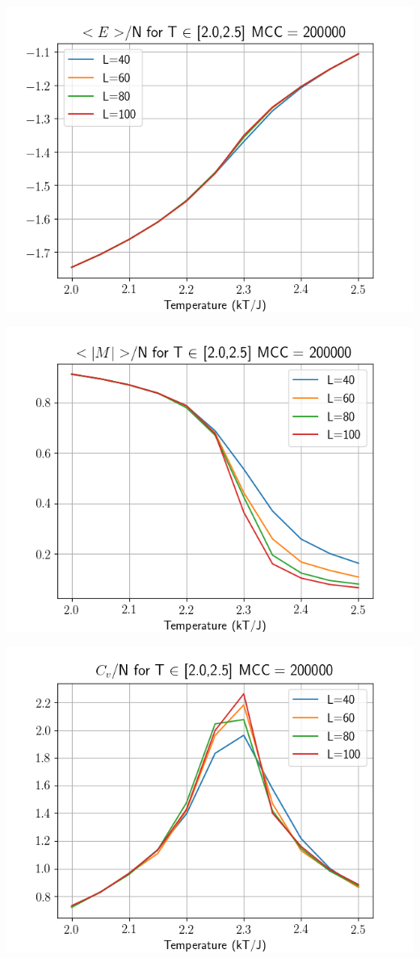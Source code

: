 \documentclass[a4paper, fontsize=11pt]{article}
\begin{document}
\begin{center}
\includegraphics[scale=0.7]{p1.png} 
\end{center}

\begin{center}
\includegraphics[scale=0.7]{p2.png} 
\end{center}

\begin{center}
\includegraphics[scale=0.7]{p3.png} 
\end{center}
\end{document}
